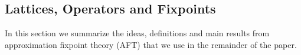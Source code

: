 \subsection{Lattices, Operators and Fixpoints}

In this section we summarize the ideas, definitions and main results from approximation fixpoint theory (AFT) that we use in the remainder of the paper.


